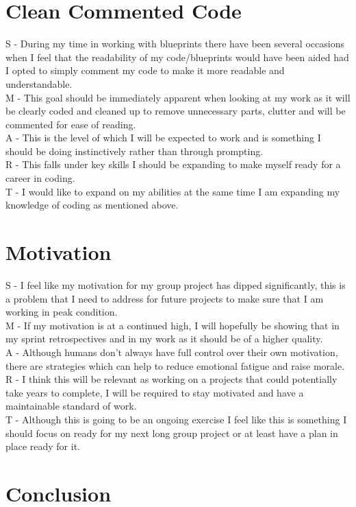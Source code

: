 \documentclass{scrartcl}
\begin{document}
\section{Clean Commented Code}
S - During my time in working with blueprints there have been several occasions when I feel that the readability of my code/blueprints would have been aided had I opted to simply comment my code to make it more readable and understandable. \\
M - This goal should be immediately apparent when looking at my work as it will be clearly coded and cleaned up to remove unnecessary parts, clutter and will be commented for ease of reading. \\
A - This is the level of which I will be expected to work and is something I should be doing instinctively rather than through prompting. \\
R - This falls under key skills I should be expanding to make myself ready for a career in coding. \\
T - I would like to expand on my abilities at the same time I am expanding my knowledge of coding as mentioned above. \\

\section{Motivation}
S - I feel like my motivation for my group project has dipped significantly, this is a problem that I need to address for future projects to make sure that I am working in peak condition. \\
M - If my motivation is at a continued high, I will hopefully be showing that in my sprint retrospectives and in my work as it should be of a higher quality. \\
A - Although humans don't always have full control over their own motivation, there are strategies which can help to reduce emotional fatigue and raise morale. \\
R - I think this will be relevant as working on a projects that could potentially take years to complete, I will be required to stay motivated and have a maintainable standard of work. \\
T - Although this is going to be an ongoing exercise I feel like this is something I should focus on ready for my next long group project or at least have a plan in place ready for it. \\

\section{Conclusion}
\end{document}
